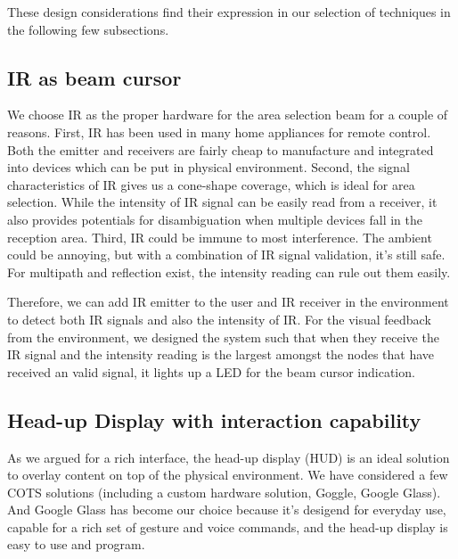 These design considerations find their expression in our selection of techniques in the following few subsections.

\subsection{IR as beam cursor}
\label{sec:ir-as-beam}
We choose IR as the proper hardware for the area selection beam for a couple of reasons. First, IR has been used in many home appliances for remote control. Both the emitter and receivers are fairly cheap to manufacture and integrated into devices which can be put in physical environment. Second, the signal characteristics of IR gives us a cone-shape coverage, which is ideal for area selection. While the intensity of IR signal can be easily read from a receiver, it also provides potentials for disambiguation when multiple devices fall in the reception area. Third, IR could be immune to most interference. The ambient could be annoying, but with a combination of IR signal validation, it's still safe. For multipath and reflection exist, the intensity reading can rule out them easily.

Therefore, we can add IR emitter to the user and IR receiver in the environment to detect both IR signals and also the intensity of IR. For the visual feedback from the environment, we designed the system such that when they receive the IR signal and the intensity reading is the largest amongst the nodes that have received an valid signal, it lights up a LED for the beam cursor indication. 

\subsection{Head-up Display with interaction capability}
\label{sec:head-up-display}
As we argued for a rich interface, the head-up display (HUD) is an ideal solution to overlay content on top of the physical environment. We have considered a few COTS solutions (including a custom hardware solution, Goggle, Google Glass). And Google Glass has become our choice because it's desigend for everyday use, capable for a rich set of gesture and voice commands, and the head-up display is easy to use and program. 

